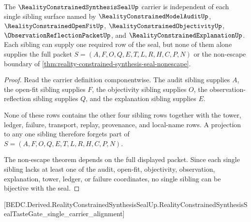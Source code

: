 \begin{theorem}
\label{thm:reality-constrained-synthesis-seal-independence-boundary}
The $\RealityConstrainedSynthesisSealUp$ carrier is independent of each single sibling surface named by $\RealityConstrainedModelAuditUp$, $\RealityConstrainedOpenFitUp$, $\RealityConstrainedObjectivityUp$, $\ObservationReflectionPacketUp$, and $\RealityConstrainedExplanationUp$. Each sibling can supply one required row of the seal, but none of them alone supplies the full packet $S=(A,F,O,Q,E,T,L,R,H,C,P,N)$ or the non-escape boundary of \autoref{thm:reality-constrained-synthesis-seal-nonescape}.
\end{theorem}
\begin{proof}
Read the carrier definition componentwise. The audit sibling supplies $A$, the open-fit sibling supplies $F$, the objectivity sibling supplies $O$, the observation-reflection sibling supplies $Q$, and the explanation sibling supplies $E$.

None of these rows contains the other four sibling rows together with the tower, ledger, failure, transport, replay, provenance, and local-name rows. A projection to any one sibling therefore forgets part of $S=(A,F,O,Q,E,T,L,R,H,C,P,N)$.

The non-escape theorem depends on the full displayed packet. Since each single sibling lacks at least one of the audit, open-fit, objectivity, observation, explanation, tower, ledger, or failure coordinates, no single sibling can be bijective with the seal.
\end{proof}



[BEDC.Derived.RealityConstrainedSynthesisSealUp.RealityConstrainedSynthesisSealTasteGate\_single\_carrier\_alignment]

